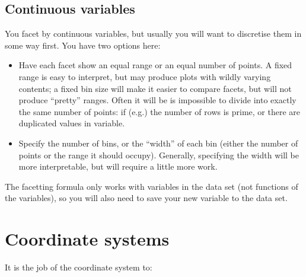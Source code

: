 \subsection{Continuous variables}\label{sub:continuous_variables}

You facet by continuous variables, but usually you will want to discretise them in some way first.  You have two options here:

\begin{itemize}
  \item Have each facet show an equal range or an equal number of points.  A fixed range is easy to interpret, but may produce plots with wildly varying contents; a fixed bin size will make it easier to compare facets, but will not produce ``pretty'' ranges.  Often it will be is impossible to divide into exactly the same number of points: if (e.g.) the number of rows is prime, or there are duplicated values in variable.
    
  \item Specify the number of bins, or the ``width'' of each bin (either the number of points or the range it should occupy).  Generally, specifying the width will be more interpretable, but will require a little more work.
  
\end{itemize}

The facetting formula only works with variables in the data set (not functions of the variables), so you will also need to save your new variable to the data set.

% 
% 
% 
% 



\section{Coordinate systems}
\label{sec:coord}

It is the job of the coordinate system to:

